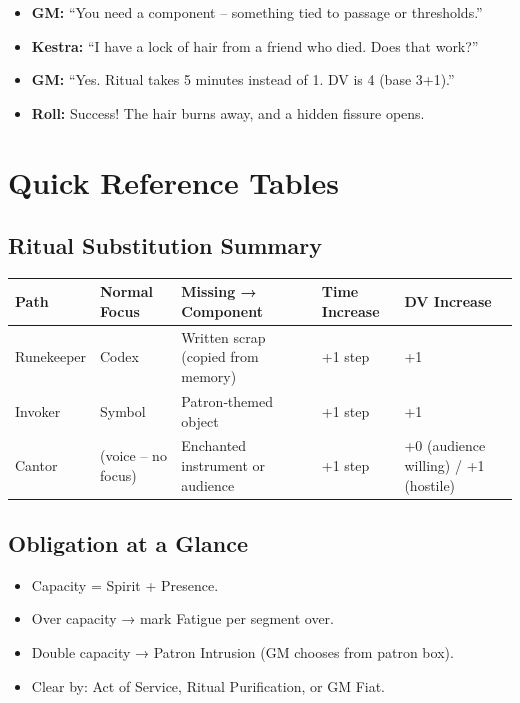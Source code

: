 \documentclass[10pt,a5paper]{book}
\begin{document}
\begin{itemize}
    \item \textbf{GM:} “You need a component – something tied to passage or thresholds.”
    \item \textbf{Kestra:} “I have a lock of hair from a friend who died. Does that work?”
    \item \textbf{GM:} “Yes. Ritual takes 5 minutes instead of 1. DV is 4 (base 3+1).”
    \item \textbf{Roll:} Success! The hair burns away, and a hidden fissure opens.
\end{itemize}

\clearpage

\chapter{Quick Reference Tables}

\section{Ritual Substitution Summary}
\begin{longtable}{p{2.5cm} p{2.5cm} p{2.5cm} p{2.5cm} p{3cm}}
\toprule
Path & Normal Focus & Missing → Component & Time Increase & DV Increase \\
\midrule
Runekeeper & Codex & Written scrap (copied from memory) & +1 step & +1 \\
Invoker & Symbol & Patron‑themed object & +1 step & +1 \\
Cantor & (voice – no focus) & Enchanted instrument or audience & +1 step & +0 (audience willing) / +1 (hostile) \\
\bottomrule
\end{longtable}

\section{Obligation at a Glance}
\begin{itemize}
    \item Capacity = Spirit + Presence.
    \item Over capacity → mark Fatigue per segment over.
    \item Double capacity → Patron Intrusion (GM chooses from patron box).
    \item Clear by: Act of Service, Ritual Purification, or GM Fiat.
\end{itemize}
\end{document}
